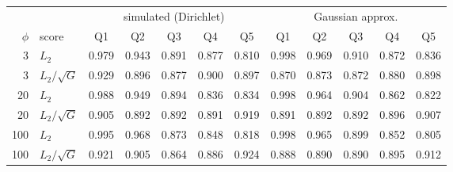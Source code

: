 \begin{tabular}{rl|ccccc|ccccc}
\toprule
 & & \multicolumn{5}{c|}{simulated (Dirichlet)} & \multicolumn{5}{c}{Gaussian approx.} \\
$\phi$ & score & Q1 & Q2 & Q3 & Q4 & Q5 & Q1 & Q2 & Q3 & Q4 & Q5 \\
\midrule
3 & $L_2$ & 0.979 & 0.943 & 0.891 & 0.877 & 0.810 & 0.998 & 0.969 & 0.910 & 0.872 & 0.836 \\
3 & $L_2/\sqrt{G}$ & 0.929 & 0.896 & 0.877 & 0.900 & 0.897 & 0.870 & 0.873 & 0.872 & 0.880 & 0.898 \\
20 & $L_2$ & 0.988 & 0.949 & 0.894 & 0.836 & 0.834 & 0.998 & 0.964 & 0.904 & 0.862 & 0.822 \\
20 & $L_2/\sqrt{G}$ & 0.905 & 0.892 & 0.892 & 0.891 & 0.919 & 0.891 & 0.892 & 0.892 & 0.896 & 0.907 \\
100 & $L_2$ & 0.995 & 0.968 & 0.873 & 0.848 & 0.818 & 0.998 & 0.965 & 0.899 & 0.852 & 0.805 \\
100 & $L_2/\sqrt{G}$ & 0.921 & 0.905 & 0.864 & 0.886 & 0.924 & 0.888 & 0.890 & 0.890 & 0.895 & 0.912 \\
\bottomrule
\end{tabular}